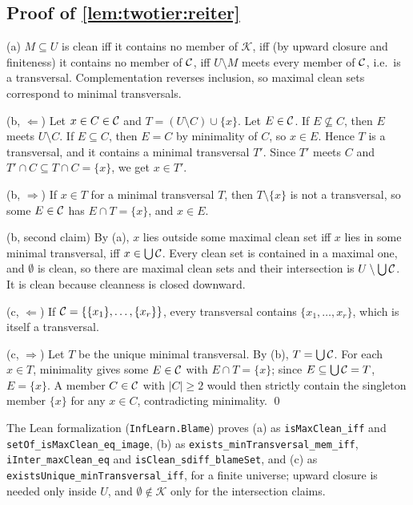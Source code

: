 \subsection{Proof of \texorpdfstring{\cref{lem:twotier:reiter}}{the hitting-set duality}}\label{app:twotier:reiter}

(a) $M\subseteq U$ is clean iff it contains no member of $\mathcal K$, iff (by upward closure and finiteness) it contains no member of $\mathcal{C}$, iff $U\setminus M$ meets every member of $\mathcal{C}$, i.e.\ is a transversal. Complementation reverses inclusion, so maximal clean sets correspond to minimal transversals.

(b, $\Leftarrow$) Let $x\in C\in\mathcal{C}$ and $T=(U\setminus C)\cup\{x\}$. Let $E\in\mathcal{C}$. If $E\not\subseteq C$, then $E$ meets $U\setminus C$. If $E\subseteq C$, then $E=C$ by minimality of $C$, so $x\in E$. Hence $T$ is a transversal, and it contains a minimal transversal $T'$. Since $T'$ meets $C$ and $T'\cap C\subseteq T\cap C=\{x\}$, we get $x\in T'$.

(b, $\Rightarrow$) If $x\in T$ for a minimal transversal $T$, then $T\setminus\{x\}$ is not a transversal, so some $E\in\mathcal{C}$ has $E\cap T=\{x\}$, and $x\in E$.

(b, second claim) By (a), $x$ lies outside some maximal clean set iff $x$ lies in some minimal transversal, iff $x\in\bigcup\mathcal{C}$. Every clean set is contained in a maximal one, and $\emptyset$ is clean, so there are maximal clean sets and their intersection is $U\setminus\bigcup\mathcal{C}$. It is clean because cleanness is closed downward.

(c, $\Leftarrow$) If $\mathcal{C}=\{\{x_1\},\dots,\{x_r\}\}$, every transversal contains $\{x_1,\dots,x_r\}$, which is itself a transversal.

(c, $\Rightarrow$) Let $T$ be the unique minimal transversal. By (b), $T=\bigcup\mathcal{C}$. For each $x\in T$, minimality gives some $E\in\mathcal{C}$ with $E\cap T=\{x\}$; since $E\subseteq\bigcup\mathcal{C}=T$, $E=\{x\}$. A member $C\in\mathcal{C}$ with $|C|\ge2$ would then strictly contain the singleton member $\{x\}$ for any $x\in C$, contradicting minimality. \qed

{\sloppy The Lean formalization (\texttt{InfLearn.Blame}) proves (a) as \texttt{isMaxClean\_iff} and \texttt{setOf\_isMaxClean\_eq\_image}, (b) as \texttt{exists\_minTransversal\_mem\_iff}, \texttt{iInter\_maxClean\_eq} and \texttt{isClean\_sdiff\_blameSet}, and (c) as \texttt{existsUnique\_minTransversal\_iff}, for a finite universe; upward closure is needed only inside $U$, and $\emptyset\notin\mathcal K$ only for the intersection claims.\par}

